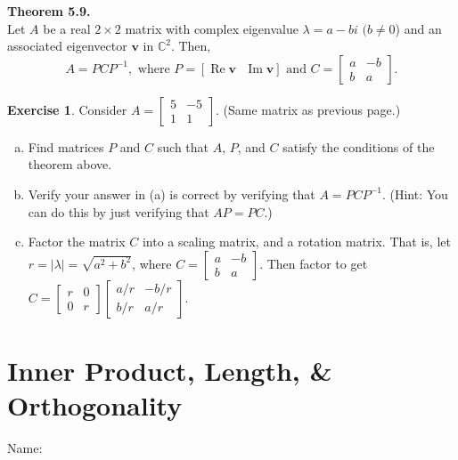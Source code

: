 \documentclass[10pt]{book}
\newcommand{\boxcolor}{gray!30}
\newenvironment{boxthm}{\begin{mdframed}[backgroundcolor=\boxcolor,nobreak=true]}{\end{mdframed}}
\theoremstyle{definition}
\newtheorem{exercise}{Exercise}[section]
\newcommand{\name}[1][2.5in]{\vspace{-2.3em}\hfill Name: \underline{\hspace{#1}}}
\newcommand{\vect}[1]{\ensuremath{\boldsymbol{\mathbf{#1}}}}
\DeclareMathOperator{\re}{Re}
\DeclareMathOperator{\im}{Im}
\begin{document}
\newpage

\begin{boxthm}
	\textbf{Theorem 5.9.} \\
	Let $A$ be a real $2 \times 2$ matrix with complex eigenvalue $\lambda = a-bi$ $(b \ne 0$) and an associated eigenvector $\vect{v}$ in $\mathbb{C}^2$. Then, $$A = PCP^{-1}, \text{ where } P = [ \re \vect{v} \text{ } \im \vect{v} ] \text{ and } C = \begin{bmatrix}a&-b\\b&a \end{bmatrix}.$$
\end{boxthm}

\begin{exercise} 
	Consider $A  = \begin{bmatrix}5&-5\\1&1 \end{bmatrix}.$ (Same matrix as previous page.)
	\begin{enumerate}[(a)]
		\item Find matrices $P$ and $C$ such that $A$, $P$, and $C$ satisfy the conditions of the theorem above.
		\vfill
		\item Verify your answer in (a) is correct by verifying that $A = PCP^{-1}$. (Hint: You can do this by just verifying that $AP=PC$.)
		\vfill
		\item Factor the matrix $C$ into a scaling matrix, and a rotation matrix. That is, let $r = |\lambda| = \sqrt{a^2+b^2}$, where $ C = \begin{bmatrix}a&-b\\b&a \end{bmatrix}.$ Then factor to get $C = \begin{bmatrix}r&0\\0&r \end{bmatrix}\begin{bmatrix}a/r&-b/r\\b/r&a/r \end{bmatrix}.$
		\vfill
	\end{enumerate}
\end{exercise}

\newpage


\setcounter{section}{0}

\section[Inner Prod., Length, \& Orth.]{Inner Product, Length, \& Orthogonality}
\name[1.5in]
\end{document}
